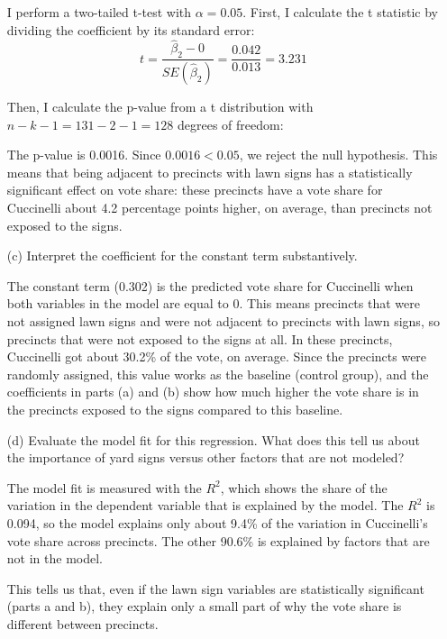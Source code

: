 \documentclass[12pt,letterpaper]{article}
\begin{document}
\begin{enumerate}
	\noindent I perform a two-tailed t-test with $\alpha = 0.05$. First, I calculate the t statistic by dividing the coefficient by its standard error:
	\begin{equation*}
		t = \frac{\hat{\beta}_2 - 0}{SE(\hat{\beta}_2)} = \frac{0.042}{0.013} = 3.231
	\end{equation*}
	
	\noindent Then, I calculate the p-value from a t distribution with $n - k - 1 = 131 - 2 - 1 = 128$ degrees of freedom:
	
	
	
	\noindent The p-value is 0.0016. Since $0.0016 < 0.05$, we reject the null hypothesis. This means that being adjacent to precincts with lawn signs has a statistically significant effect on vote share: these precincts have a vote share for Cuccinelli about 4.2 percentage points higher, on average, than precincts not exposed to the signs.
	
	\vspace{1cm}
	\item [(c)] Interpret the coefficient for the constant term substantively.
	
	\noindent The constant term (0.302) is the predicted vote share for Cuccinelli when both variables in the model are equal to 0. This means precincts that were not assigned lawn signs and were not adjacent to precincts with lawn signs, so precincts that were not exposed to the signs at all. In these precincts, Cuccinelli got about 30.2\% of the vote, on average. Since the precincts were randomly assigned, this value works as the baseline (control group), and the coefficients in parts (a) and (b) show how much higher the vote share is in the precincts exposed to the signs compared to this baseline.
	
	\vspace{1cm}
	\item [(d)] Evaluate the model fit for this regression.  What does this	tell us about the importance of yard signs versus other factors that are not modeled?
	
	\noindent The model fit is measured with the $R^2$, which shows the share of the variation in the dependent variable that is explained by the model. The $R^2$ is 0.094, so the model explains only about 9.4\% of the variation in Cuccinelli's vote share across precincts. The other 90.6\% is explained by factors that are not in the model.
	
	\noindent This tells us that, even if the lawn sign variables are statistically significant (parts a and b), they explain only a small part of why the vote share is different between precincts.
	
\end{enumerate}  
\end{document}
